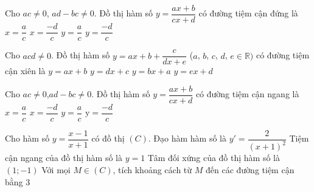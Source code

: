 \begin{ex}%
	 Cho $ac\neq 0$, $ad-bc\neq 0$. Đồ thị hàm số $y=\dfrac{ax+b}{cx+d}$ có đường tiệm cận đứng là
	 \choice
		{$x=\dfrac{a}{c}$} 
		{\True  $x=\dfrac{-d}{c}$}
		 {$y=\dfrac{a}{c}$}
		 {$y=\dfrac{-d}{c}$}
\end{ex}

\begin{ex}%
	Cho $acd\neq 0$. Đồ thị hàm số $y=ax+b+\dfrac{c}{dx+e}$ ($a$, $b$,  $c$, $d$, $e\in\mathbb{R})$ có đường tiệm cận xiên là
	\choice 
		{\True  $y=ax+b$}
		{$y=dx+c$} 
		{$y=bx+a$} 
		 {$y=ex+d$}
\end{ex}

\begin{ex}%
	Cho $ac \neq 0$,$ad-bc\neq 0$. Đồ thị hàm số $y=\dfrac{ax+b}{cx+d}$ có đường  tiệm cận ngang là
	\choice 
		 {$x=\dfrac{a}{c}$}
		{$x=\dfrac{-d}{c}$} 
		{\True  $y=\dfrac{a}{c}$}
		 {$\mathrm{y}=\dfrac{-d}{c}$}
\end{ex}

\begin{ex}%
	Cho hàm số $y=\dfrac{x-1}{x+1}$ có đồ  thị $\left( C \right)$.
	 \choiceTF
		{\True Đạo hàm  hàm số là $y'=\dfrac{2}{\left( x+1 \right)^2}$}
		{\True Tiệm cận ngang của đồ thị hàm số  là $y=1$}
		{Tâm đối xứng của đồ thị hàm số  là $\left( 1;-1 \right)$}
		{Với mọi $M\in \left( C \right)$, tích khoảng cách từ $M$  đến các đường tiệm cận bằng $3$}
\end{ex}

